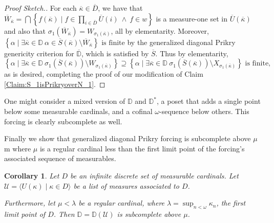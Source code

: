 \documentclass{amsart}
\newtheorem{corollary}[theorem]{Corollary}
\theoremstyle{definition}
\theoremstyle{remark}
\newcommand{\D}{\mathbb{D}}
\renewcommand{\S}{{\overline{S}}}
\newcommand{\U}{\mathcal{U}}
\newcommand{\st}{\; | \;}
\newcommand{\set}[2]{\left\{#1\st #2 \right\}}
\newcommand{\seq}[2]{\langle #1 \st #2 \rangle}
\begin{document}
\begin{proof}[Proof Sketch.]
For each $\overline \kappa \in \overline D$, we have that $\overline W_{\overline \kappa} = \bigcap \set{f(\overline \kappa) }{ f \in \prod_{i\in \overline D} \overline U(i) \ \land \ f \in w }$ is a measure-one set in $\overline U(\overline \kappa)$ and also that $\sigma_1(\overline W_{\overline \kappa}) = W_{\sigma_1(\overline \kappa)}$, all by elementarity. Moreover, 
$\set{ \alpha }{ \exists \overline \kappa \in \D \ \alpha \in \overline S(\overline \kappa) \setminus \overline W_{\overline \kappa} } \text{ is finite}$ by the generalized diagonal Prikry genericity criterion for $\overline{\D}$, which is satisfied by $\overline S$.
Thus by elementarity,
$$\set{ \alpha }{ \exists \overline \kappa \in \D \ \sigma_1(\S(\overline \kappa)) \setminus W_{\sigma_1(\overline \kappa)} } \supseteq \set{ \alpha }{ \exists \overline \kappa \in \D \ \sigma_1(\S(\overline \kappa)) \setminus X_{\sigma_1(\overline \kappa)}} \text{ is finite,}$$
as is desired, completing the proof of our modification of Claim \ref{Claim:S_1isPrikryoverN_1}. 
\end{proof}

One might consider a mixed version of $\D$ and $\D^*$, a poset that adds a single point below some measurable cardinals, and a cofinal $\omega$-sequence below others. This forcing is clearly subcomplete as well.

Finally we show that generalized diagonal Prikry forcing is subcomplete above $\mu$m where $\mu$ is a regular cardinal less than the first limit point of the forcing's associated sequence of measurables.

\begin{corollary}\label{corollary:SCaboveMu} Let $D$ be an infinite discrete set of measurable cardinals. Let $\U = \seq{ U(\kappa) }{ \kappa \in D }$ be a list of measures associated to $D$. 

Furthermore, let $\mu < \lambda$ be a regular cardinal, where $\lambda = \sup_{n<\omega} \kappa_n$, the first limit point of $D$.
Then $\D=\D(\U)$ is subcomplete above $\mu$. \end{corollary}
\end{document}

